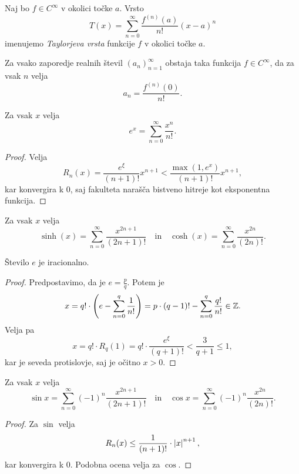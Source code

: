 \documentclass[12pt, a4paper]{article}
\begin{document}
\begin{okvir}
\begin{definicija}
Naj bo $f\in C^\infty$ v okolici točke $a$. Vrsto
\[
T(x)=\sum_{n=0}^\infty\frac{f^{(n)}(a)}{n!}(x-a)^n
\]
imenujemo \emph{Taylorjeva vrsta} funkcije $f$ v okolici točke $a$.
\end{definicija}
\end{okvir}

\begin{opomba}
Za vsako zaporedje realnih števil $(a_n)_{n=1}^\infty$ obstaja taka funkcija $f\in C^\infty$, da za vsak $n$ velja
\[
a_n=\frac{f^{(n)}(0)}{n!}.
\]
\end{opomba}

\begin{trditev}
Za vsak $x$ velja
\[
e^x=\sum_{n=0}^\infty\frac{x^n}{n!}.
\]
\end{trditev}

\begin{proof}
Velja
\[
R_n(x)=\frac{e^{\xi}}{(n+1)!}x^{n+1}<\frac{\max(1,e^x)}{(n+1)!}x^{n+1},
\]
kar konvergira k $0$, saj fakulteta narašča bistveno hitreje kot eksponentna funkcija.
\end{proof}

\begin{posledica}
Za vsak $x$ velja
\[
\sinh(x)=\sum_{n=0}^\infty\frac{x^{2n+1}}{(2n+1)!}\quad\text{in}\quad\cosh(x)=\sum_{n=0}^\infty\frac{x^{2n}}{(2n)!}.
\]
\end{posledica}

\begin{posledica}
Število $e$ je iracionalno.
\end{posledica}

\begin{proof}
Predpostavimo, da je $e=\frac{p}{q}$. Potem je
\[
x=q!\cdot\left(e-\sum_{n=0}^q\frac{1}{n!}\right)=p\cdot(q-1)!-\sum_{n=0}^q\frac{q!}{n!}\in\mathbb{Z}.
\]
Velja pa
\[
x=q!\cdot R_q(1)=q!\cdot\frac{e^\xi}{(q+1)!}<\frac{3}{q+1}\leq 1,
\]
kar je seveda protislovje, saj je očitno $x>0$.
\end{proof}

\begin{trditev}
Za vsak $x$ velja
\[
\sin x=\sum_{n=0}^\infty(-1)^n\frac{x^{2n+1}}{(2n+1)!}\quad\text{in}\quad\cos x=\sum_{n=0}^\infty(-1)^n\frac{x^{2n}}{(2n)!}.
\]
\end{trditev}

\begin{proof}
Za $\sin$ velja
\[
R_n(x)\leq\frac{1}{(n+1)!}\cdot\left\lvert x\right\rvert^{n+1},
\]
kar konvergira k $0$. Podobna ocena velja za $\cos$.
\end{proof}
\end{document}
